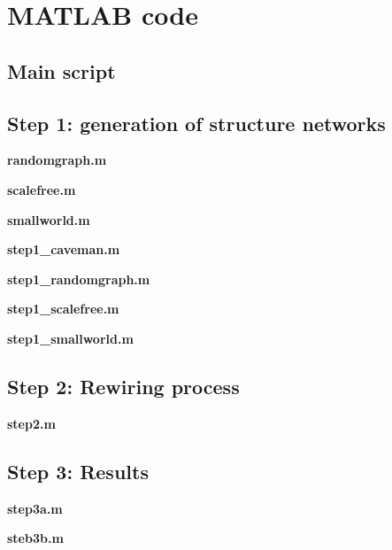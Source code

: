 \section{MATLAB code}
\subsection{Main script}


\newpage

\subsection{Step 1: generation of structure networks}

\textbf{randomgraph.m}

\newpage

\textbf{scalefree.m}


\bigskip
\bigskip

\textbf{smallworld.m}


\newpage

\textbf{step1\_caveman.m}


\newpage

\textbf{step1\_randomgraph.m}


\newpage

\textbf{step1\_scalefree.m}


\bigskip
\bigskip

\textbf{step1\_smallworld.m}


\newpage

\subsection{Step 2: Rewiring process}

\textbf{step2.m}



\subsection{Step 3: Results}

\textbf{step3a.m}


\newpage

\textbf{steb3b.m}


\bigskip
\bigskip

